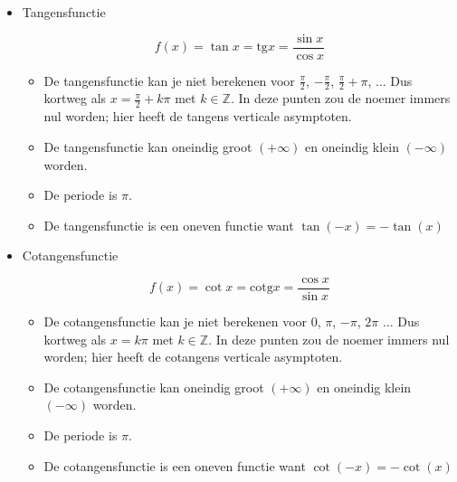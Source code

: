 \begin{itemize}
\item{Tangensfunctie}

\begin{equation*}
f(x)=\tan x=\textrm{tg}x=\frac{\sin x}{\cos x}
\end{equation*}


\begin{figure}[H]
	\centering
	
\end{figure}


\begin{itemize}
	\item De tangensfunctie kan je niet berekenen voor $\frac{\pi}{2}$, $-\frac{\pi}{2}$,
	$\frac{\pi}{2}+\pi$, $\ldots$ Dus kortweg als $x=\frac{\pi}{2}+k\pi$
	met $k\in\mathbb{Z}$. In deze punten zou de noemer immers nul worden;
	hier heeft de tangens verticale asymptoten.
	\item De tangensfunctie kan oneindig groot $(+\infty)$ en oneindig klein
	$(-\infty)$ worden.
	\item De periode is $\pi$.
	\item De tangensfunctie is een oneven functie want $\tan(-x)=-\tan(x)$
\end{itemize}

\item{Cotangensfunctie}

\begin{equation*}
f(x)=\cot x=\textrm{cotg}x=\frac{\cos x}{\sin x}
\end{equation*}




\begin{figure}[H]
	\centering
	
\end{figure}


\begin{itemize}
	\item De cotangensfunctie kan je niet berekenen voor $0$, $\pi$, $-\pi$,
	$2\pi$ $\ldots$ Dus kortweg als $x=k\pi$ met $k\in\mathbb{Z}$.
	In deze punten zou de noemer immers nul worden; hier heeft de cotangens
	verticale asymptoten.
	\item De cotangensfunctie kan oneindig groot $(+\infty)$ en oneindig klein
	$(-\infty)$ worden.
	\item De periode is $\pi$.
	\item De cotangensfunctie is een oneven functie want $\cot(-x)=-\cot(x)$
\end{itemize}

\end{itemize}

